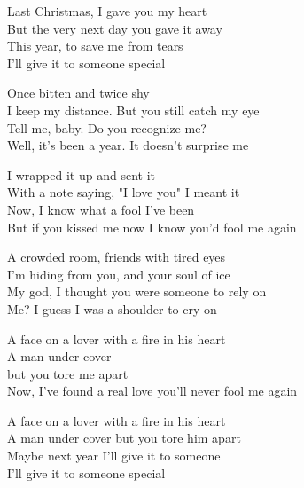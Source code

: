 
\cho{}
Last Christmas, I gave you my heart\\
But the very next day you gave it away\\
This year, to save me from tears\\
I'll give it to someone special

\ve{}
Once bitten and twice shy\\
I keep my distance. But you still catch my eye\\
Tell me, baby. Do you recognize me?\\
Well, it's been a year. It doesn't surprise me

\ve{}
I wrapped it up and sent it\\
With a note saying, "I love you" I meant it\\
Now, I know what a fool I've been\\
But if you kissed me now I know you'd fool me again

\cho{}

\ve{}
A crowded room, friends with tired eyes\\
I'm hiding from you, and your soul of ice\\
My god, I thought you were someone to rely on\\
Me? I guess I was a shoulder to cry on

\ve{}
A face on a lover with a fire in his heart\\
A man under cover\\
but you tore me apart\\
Now, I've found a real love you'll never fool me again

\cho{}

\ve{}
A face on a lover with a fire in his heart\\
A man under cover but you tore him apart\\
Maybe next year I'll give it to someone\\
I'll give it to someone special

\esong{}